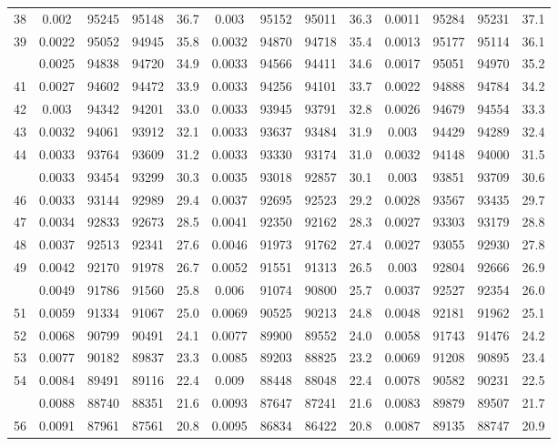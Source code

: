 \documentclass[
  14pt,
]{article}
\begin{document}
\begin{longtable}[t]{lcccccccccccc}
38 & 0.002 & 95245 & 95148 & 36.7 & 0.003 & 95152 & 95011 & 36.3 & 0.0011 & 95284 & 95231 & 37.1\\
39 & 0.0022 & 95052 & 94945 & 35.8 & 0.0032 & 94870 & 94718 & 35.4 & 0.0013 & 95177 & 95114 & 36.1\\
\addlinespace
40 & 0.0025 & 94838 & 94720 & 34.9 & 0.0033 & 94566 & 94411 & 34.6 & 0.0017 & 95051 & 94970 & 35.2\\
41 & 0.0027 & 94602 & 94472 & 33.9 & 0.0033 & 94256 & 94101 & 33.7 & 0.0022 & 94888 & 94784 & 34.2\\
42 & 0.003 & 94342 & 94201 & 33.0 & 0.0033 & 93945 & 93791 & 32.8 & 0.0026 & 94679 & 94554 & 33.3\\
43 & 0.0032 & 94061 & 93912 & 32.1 & 0.0033 & 93637 & 93484 & 31.9 & 0.003 & 94429 & 94289 & 32.4\\
44 & 0.0033 & 93764 & 93609 & 31.2 & 0.0033 & 93330 & 93174 & 31.0 & 0.0032 & 94148 & 94000 & 31.5\\
\addlinespace
45 & 0.0033 & 93454 & 93299 & 30.3 & 0.0035 & 93018 & 92857 & 30.1 & 0.003 & 93851 & 93709 & 30.6\\
46 & 0.0033 & 93144 & 92989 & 29.4 & 0.0037 & 92695 & 92523 & 29.2 & 0.0028 & 93567 & 93435 & 29.7\\
47 & 0.0034 & 92833 & 92673 & 28.5 & 0.0041 & 92350 & 92162 & 28.3 & 0.0027 & 93303 & 93179 & 28.8\\
48 & 0.0037 & 92513 & 92341 & 27.6 & 0.0046 & 91973 & 91762 & 27.4 & 0.0027 & 93055 & 92930 & 27.8\\
49 & 0.0042 & 92170 & 91978 & 26.7 & 0.0052 & 91551 & 91313 & 26.5 & 0.003 & 92804 & 92666 & 26.9\\
\addlinespace
50 & 0.0049 & 91786 & 91560 & 25.8 & 0.006 & 91074 & 90800 & 25.7 & 0.0037 & 92527 & 92354 & 26.0\\
51 & 0.0059 & 91334 & 91067 & 25.0 & 0.0069 & 90525 & 90213 & 24.8 & 0.0048 & 92181 & 91962 & 25.1\\
52 & 0.0068 & 90799 & 90491 & 24.1 & 0.0077 & 89900 & 89552 & 24.0 & 0.0058 & 91743 & 91476 & 24.2\\
53 & 0.0077 & 90182 & 89837 & 23.3 & 0.0085 & 89203 & 88825 & 23.2 & 0.0069 & 91208 & 90895 & 23.4\\
54 & 0.0084 & 89491 & 89116 & 22.4 & 0.009 & 88448 & 88048 & 22.4 & 0.0078 & 90582 & 90231 & 22.5\\
\addlinespace
55 & 0.0088 & 88740 & 88351 & 21.6 & 0.0093 & 87647 & 87241 & 21.6 & 0.0083 & 89879 & 89507 & 21.7\\
56 & 0.0091 & 87961 & 87561 & 20.8 & 0.0095 & 86834 & 86422 & 20.8 & 0.0087 & 89135 & 88747 & 20.9\\

\end{longtable}
\end{document}
